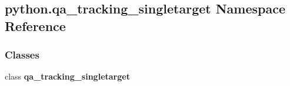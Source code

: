\subsection{python.\+qa\+\_\+tracking\+\_\+singletarget Namespace Reference}
\label{namespacepython_1_1qa__tracking__singletarget}
\subsubsection*{Classes}
\begin{DoxyCompactItemize}
\item 
class {\bf qa\+\_\+tracking\+\_\+singletarget}
\end{DoxyCompactItemize}
